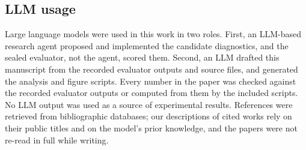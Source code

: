 \documentclass{article}
\begin{document}
\subsection{LLM usage}
Large language models were used in this work in two roles. First, an LLM-based research agent proposed and implemented the candidate diagnostics, and the sealed evaluator, not the agent, scored them. Second, an LLM drafted this manuscript from the recorded evaluator outputs and source files, and generated the analysis and figure scripts. Every number in the paper was checked against the recorded evaluator outputs or computed from them by the included scripts. No LLM output was used as a source of experimental results. References were retrieved from bibliographic databases; our descriptions of cited works rely on their public titles and on the model's prior knowledge, and the papers were not re-read in full while writing.
\end{document}
